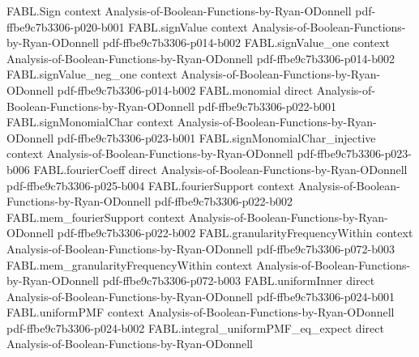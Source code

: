 \begin{theorem}
\label{FABL.FiniteFourierBasis.project_orthogonalDoobDifference_eq_zero}
\leanok
{}
\proofstep
  {FABL.Sign}
  {context}
  {Analysis-of-Boolean-Functions-by-Ryan-ODonnell}
  {pdf-ffbe9c7b3306-p020-b001}
\proofstep
  {FABL.signValue}
  {context}
  {Analysis-of-Boolean-Functions-by-Ryan-ODonnell}
  {pdf-ffbe9c7b3306-p014-b002}
\proofstep
  {FABL.signValue_one}
  {context}
  {Analysis-of-Boolean-Functions-by-Ryan-ODonnell}
  {pdf-ffbe9c7b3306-p014-b002}
\proofstep
  {FABL.signValue_neg_one}
  {context}
  {Analysis-of-Boolean-Functions-by-Ryan-ODonnell}
  {pdf-ffbe9c7b3306-p014-b002}
\proofstep
  {FABL.monomial}
  {direct}
  {Analysis-of-Boolean-Functions-by-Ryan-ODonnell}
  {pdf-ffbe9c7b3306-p022-b001}
\proofstep
  {FABL.signMonomialChar}
  {context}
  {Analysis-of-Boolean-Functions-by-Ryan-ODonnell}
  {pdf-ffbe9c7b3306-p023-b001}
\proofstep
  {FABL.signMonomialChar_injective}
  {context}
  {Analysis-of-Boolean-Functions-by-Ryan-ODonnell}
  {pdf-ffbe9c7b3306-p023-b006}
\proofstep
  {FABL.fourierCoeff}
  {direct}
  {Analysis-of-Boolean-Functions-by-Ryan-ODonnell}
  {pdf-ffbe9c7b3306-p025-b004}
\proofstep
  {FABL.fourierSupport}
  {context}
  {Analysis-of-Boolean-Functions-by-Ryan-ODonnell}
  {pdf-ffbe9c7b3306-p022-b002}
\proofstep
  {FABL.mem_fourierSupport}
  {context}
  {Analysis-of-Boolean-Functions-by-Ryan-ODonnell}
  {pdf-ffbe9c7b3306-p022-b002}
\proofstep
  {FABL.granularityFrequencyWithin}
  {context}
  {Analysis-of-Boolean-Functions-by-Ryan-ODonnell}
  {pdf-ffbe9c7b3306-p072-b003}
\proofstep
  {FABL.mem_granularityFrequencyWithin}
  {context}
  {Analysis-of-Boolean-Functions-by-Ryan-ODonnell}
  {pdf-ffbe9c7b3306-p072-b003}
\proofstep
  {FABL.uniformInner}
  {direct}
  {Analysis-of-Boolean-Functions-by-Ryan-ODonnell}
  {pdf-ffbe9c7b3306-p024-b001}
\proofstep
  {FABL.uniformPMF}
  {context}
  {Analysis-of-Boolean-Functions-by-Ryan-ODonnell}
  {pdf-ffbe9c7b3306-p024-b002}
\proofstep
  {FABL.integral_uniformPMF_eq_expect}
  {direct}
  {Analysis-of-Boolean-Functions-by-Ryan-ODonnell}

\end{theorem}

